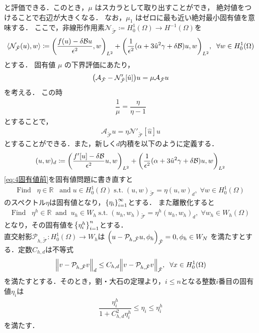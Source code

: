 と評価できる．このとき，\(\mu\) はスカラとして取り出すことができ， 
絶対値をつけることで右辺が大きくなる．
なお，\(\mu_1\) はゼロに最も近い絶対最小固有値を意味する．
ここで，非線形作用素\(\mathcal{N}_{\tilde{\mathcal{F}}}\coloneqq H^1_0(\Omega)\rightarrow H^{-1}(\Omega)\)を
\begin{align}
  \langle \mathcal{N}_{\tilde{\mathcal{F}}} (u) , w \rangle
  \coloneqq \qty(\frac{f(u)-\delta \mathcal{B}u}{\epsilon^2} , w)_{L^2}
  +\qty(\dfrac{1}{\epsilon^2}(\alpha + 3\hat{u}^2\gamma +\delta \mathcal{B})u , w)_{L^2},\;\;\forall w \in H^1_0(\Omega)
\end{align}
とする．
固有値 \(\mu\) の下界評価にあたり，
\begin{align}
  \qty(\mathcal{A}_{\tilde{\mathcal{F}}} - \mathcal{N}'_{\tilde{\mathcal{F}}} [\hat{u}])u =\mu \mathcal{A}_{\tilde{\mathcal{F}}} u
\end{align}
を考える．
この時
\begin{align}
  \dfrac{1}{\mu} = \dfrac{\eta}{\eta - 1}
\end{align}
とすることで，
\begin{align}\label{eq:4固有値前}
  \mathcal{A}_{\tilde{\mathcal{F}}} u = \eta \mathcal{N'}_{\tilde{\mathcal{F}}}[\hat{u}] u 
\end{align}
とすることができる．また，新しく\(d\)内積を以下のように定義する．
\begin{align}
   (u,w)_d \coloneqq \qty(\dfrac{f'[u]-\delta \mathcal{B}}{\epsilon^2}u,w)_{L^2}+\qty(\dfrac{1}{\epsilon^2}(\alpha + 3\hat{u}^2\gamma +\delta \mathcal{B})u,w)_{L^2}
\end{align}
\eqref{eq:4固有値前}を固有値問題に書き直すと
\begin{align}
  \text{Find} \;\;\;\eta \in \mathbb{R}\;\;\; \text{and} \;u\in H^1_0(\Omega)\;\text{s.t.}\;(u, w)_{\tilde{\mathcal{F}}} = \eta (u,w)_d,\;\forall w \in H^1_0 (\Omega)
\end{align}
のスペクトル\(\eta\)は固有値となり，\(\qty{\eta_i}^\infty_{i=1}\)とする．
また離散化すると
\begin{align}
  \text{Find} \;\;\;\eta^h \in \mathbb{R} \;\;\text{and} \;\;u_h\in W_h\;\text{s.t.}\;(u_h, w_h)_{\tilde{\mathcal{F}}} = \eta^h (u_h,w_h)_d,\;\forall w_h \in W_h (\Omega)
\end{align}
となり，その固有値を\(\qty{\eta^h_i}^n_{i=1}\)とする．\\
直交射影\(\mathcal{P}_{h,\tilde{\mathcal{F}}}:H^1_0(\Omega)\rightarrow W_h\)は
\(\qty(u-\mathcal{P}_{h,\tilde{\mathcal{F}} }u , \phi_h)_{\tilde{\mathcal{F}}} = 0,\phi_h\in W_N\)
を満たすとする．定数\(C_{h,d}\)は不等式
\begin{align}\label{eq:C&v-p}
  \norm{v-\mathcal{P}_{h,\tilde{\mathcal{F}}}v}_d 
  \leq C_{h,d} 
  \norm{v-\mathcal{P}_{h,\tilde{\mathcal{F}}}v}_{\tilde{\mathcal{F}}},
  \;\;\forall x \in H^1_0(\Omega)
\end{align}
を満たすとする．そのとき，劉・大石の定理より，\(i \leq n\)となる整数\(i\)番目の固有値\(\eta_i\)は
\begin{align}
  \dfrac{\eta^h_i}{1+C_{h,d}^2\eta^h_i} \leq \eta_i \leq  \eta^h_i
\end{align}
を満たす．

